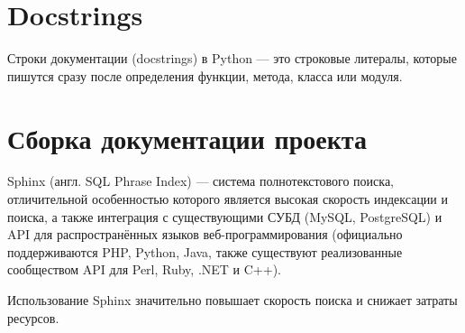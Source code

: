 \section{Docstrings}
Строки документации (docstrings) в Python --- это строковые литералы,
которые пишутся сразу после определения функции, метода, класса или модуля.

\section{Сборка документации проекта}
Sphinx (англ. SQL Phrase Index) --- система полнотекстового поиска,
отличительной особенностью которого является высокая скорость индексации
и поиска, а также интеграция с существующими СУБД (MySQL, PostgreSQL)
и API для распространённых языков веб-программирования
(официально поддерживаются PHP, Python, Java, также существуют реализованные
сообществом API для Perl, Ruby, .NET и C++).\par
Использование Sphinx значительно повышает скорость поиска и снижает
затраты ресурсов.

